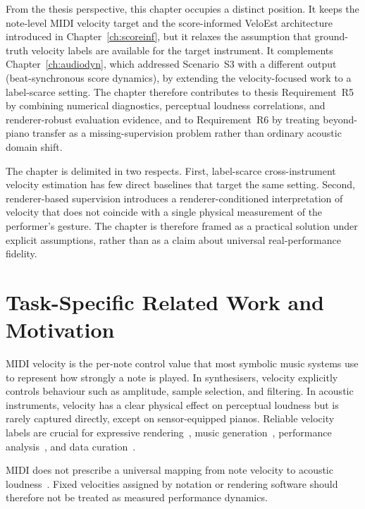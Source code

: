 From the thesis perspective, this chapter occupies a distinct position. It keeps the note-level MIDI velocity target and the score-informed VeloEst architecture introduced in Chapter~\ref{ch:scoreinf}, but it relaxes the assumption that ground-truth velocity labels are available for the target instrument. It complements Chapter~\ref{ch:audiodyn}, which addressed Scenario~S3 with a different output (beat-synchronous score dynamics), by extending the velocity-focused work to a label-scarce setting. The chapter therefore contributes to thesis Requirement~R5 by combining numerical diagnostics, perceptual loudness correlations, and renderer-robust evaluation evidence, and to Requirement~R6 by treating beyond-piano transfer as a missing-supervision problem rather than ordinary acoustic domain shift.

The chapter is delimited in two respects. First, label-scarce cross-instrument velocity estimation has few direct baselines that target the same setting. Second, renderer-based supervision introduces a renderer-conditioned interpretation of velocity that does not coincide with a single physical measurement of the performer's gesture. The chapter is therefore framed as a practical solution under explicit assumptions, rather than as a claim about universal real-performance fidelity.

\section{Task-Specific Related Work and Motivation}
\label{sec:bp:related}

MIDI velocity is the per-note control value that most symbolic music systems use to represent how strongly a note is played. In synthesisers, velocity explicitly controls behaviour such as amplitude, sample selection, and filtering. In acoustic instruments, velocity has a clear physical effect on perceptual loudness but is rarely captured directly, except on sensor-equipped pianos. Reliable velocity labels are crucial for expressive rendering~\cite{rhyu2022sketching, zhang2024dexter}, music generation~\cite{tang2025integrated, borovik2025symupe}, performance analysis~\cite{morsi2025enable_rach3}, and data curation~\cite{zhang2022atepp}.

MIDI does not prescribe a universal mapping from note velocity to acoustic loudness~\cite{dan2006psy}. Fixed velocities assigned by notation or rendering software should therefore not be treated as measured performance dynamics.

